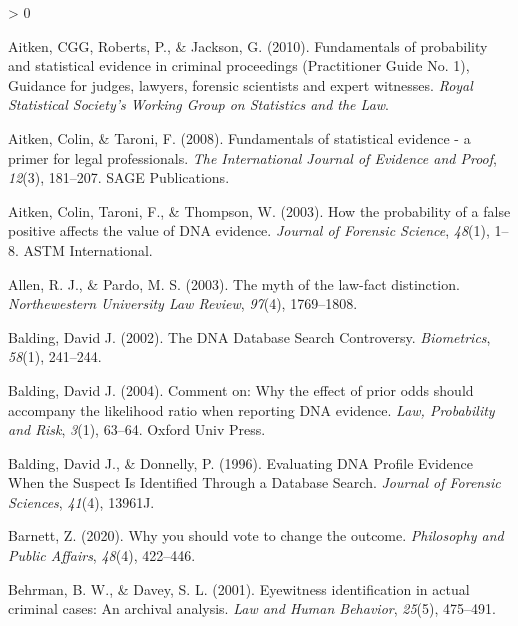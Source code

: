 \documentclass[
  10pt,
  dvipsnames,enabledeprecatedfontcommands]{scrartcl}
\newlength{\cslhangindent}
\newenvironment{CSLReferences}[2] %
 {%
  \setlength{\parindent}{0pt}
  \ifodd #1 \everypar{\setlength{\hangindent}{\cslhangindent}}\ignorespaces\fi
  \ifnum #2 > 0
  \setlength{\parskip}{#2\baselineskip}
  \fi
 }%
 {}
\begin{document}
\hypertarget{refs}{}
\begin{CSLReferences}{1}{0}
\leavevmode\hypertarget{ref-aitken2010fundamentals}{}%
Aitken, CGG, Roberts, P., \& Jackson, G. (2010). Fundamentals of
probability and statistical evidence in criminal proceedings
({P}ractitioner {G}uide {N}o. 1), {G}uidance for judges, lawyers,
forensic scientists and expert witnesses. \emph{Royal Statistical
Society's Working Group on Statistics and the Law}.

\leavevmode\hypertarget{ref-aitken2008fundamentals}{}%
Aitken, Colin, \& Taroni, F. (2008). Fundamentals of statistical
evidence - a primer for legal professionals. \emph{The International
Journal of Evidence and Proof}, \emph{12}(3), 181--207. SAGE
Publications.

\leavevmode\hypertarget{ref-aitken2003probability}{}%
Aitken, Colin, Taroni, F., \& Thompson, W. (2003). How the probability
of a false positive affects the value of DNA evidence. \emph{Journal of
Forensic Science}, \emph{48}(1), 1--8. ASTM International.

\leavevmode\hypertarget{ref-Allen2003facts}{}%
Allen, R. J., \& Pardo, M. S. (2003). The myth of the law-fact
distinction. \emph{Northewestern University Law Review}, \emph{97}(4),
1769--1808.

\leavevmode\hypertarget{ref-balding2002DNDatabaseSearch}{}%
Balding, David J. (2002). The {DNA Database Search Controversy}.
\emph{Biometrics}, \emph{58}(1), 241--244.

\leavevmode\hypertarget{ref-balding2004comment}{}%
Balding, David J. (2004). Comment on: Why the effect of prior odds
should accompany the likelihood ratio when reporting DNA evidence.
\emph{Law, Probability and Risk}, \emph{3}(1), 63--64. Oxford Univ
Press.

\leavevmode\hypertarget{ref-balding1996EvaluatingDNAProfilea}{}%
Balding, David J., \& Donnelly, P. (1996). Evaluating {DNA Profile
Evidence When} the {Suspect Is Identified Through} a {Database Search}.
\emph{Journal of Forensic Sciences}, \emph{41}(4), 13961J.

\leavevmode\hypertarget{ref-Barnett2020Why}{}%
Barnett, Z. (2020). Why you should vote to change the outcome.
\emph{Philosophy and Public Affairs}, \emph{48}(4), 422--446.

\leavevmode\hypertarget{ref-behrman2001EyewitnessIdentificationActual}{}%
Behrman, B. W., \& Davey, S. L. (2001). Eyewitness identification in
actual criminal cases: {An} archival analysis. \emph{Law and Human
Behavior}, \emph{25}(5), 475--491.


\end{CSLReferences}
\end{document}

